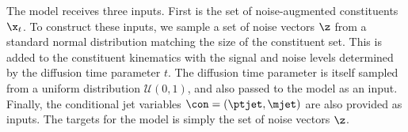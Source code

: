 The model receives three inputs.
First is the set of noise-augmented constituents $\x_t$.
To construct these inputs, we sample a set of noise vectors $\z$ from a standard normal distribution matching the size of the constituent set.
This is added to the constituent kinematics with the signal and noise levels determined by the diffusion time parameter $t$.
The diffusion time parameter is itself sampled from a uniform distribution $\mathcal{U}(0, 1)$, and also passed to the model as an input.
Finally, the conditional jet variables $\con = (\ptjet, \mjet)$ are also provided as inputs.
The targets for the model is simply the set of noise vectors $\z$.







